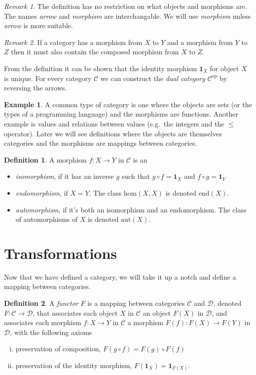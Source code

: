 \documentclass[11pt,a4paper]{scrartcl}
\newcommand{\idm}[1]{\mathbf{1}_{#1}}
\newcommand{\cdef}[1]{\emph{#1}}
\theoremstyle{plain}
\theoremstyle{definition}
\newtheorem{defn}{Definition}
\newtheorem{exmp}{Example}
\theoremstyle{remark}
\newtheorem*{remark}{Remark}
\begin{document}
\begin{remark}
	The definition has no restriction on what objects and morphisms are. The names \emph{arrow} and \emph{morphism} are interchangable. We will use \emph{morphism} unless \emph{arrow} is more suitable.
\end{remark}
\begin{remark}
	If a category has a morphism from $X$ to $Y$ and a morphism from $Y$ to $Z$ then it must also contain the composed morphism from $X$ to $Z$.
\end{remark}

From the definition it can be shown that the identity morphism $\idm{X}$ for object $X$ is unique. For every category $\mathcal C$ we can construct the \cdef{dual category} $\mathcal{C}^\text{op}$ by reversing the arrows.

\begin{exmp}
	A common type of category is one where the objects are sets (or the types of a programming language) and the morphisms are functions. Another example is values and relations between values (e.g.\ the integers and the $\leq$ operator). Later we will see definitions where the objects are themselves categories and the morphisms are mappings between categories.
\end{exmp}

\begin{defn}
A morphism $f\colon X \to Y$ in $\mathcal C$ is an
\begin{itemize}
	\item \cdef{isomorphism}, if it has an inverse $g$ such that $g\circ f = \idm{X}$ and $f\circ g = \idm{Y}$
	\item \cdef{endomorphism}, if $X = Y$. The class $\text{hom}(X, X)$ is denoted $\text{end}(X)$.
	\item \cdef{automorphism}, if it's both an isomorphism and an endomorphism. The class of automorphisms of $X$ is denoted $\text{aut}(X)$.
\end{itemize}
\end{defn}

\section{Transformations}

Now that we have defined a category, we will take it up a notch and define a mapping between categories.

\begin{defn}
A \cdef{functor} $F$ is a mapping between categories $\mathcal{C}$ and $\mathcal{D}$, denoted $F\colon \mathcal{C} \to \mathcal{D}$, that associates each object $X$ in $\mathcal{C}$ an object $F(X)$ in $\mathcal{D}$, and associates each morphism $f\colon X \to Y$ in $\mathcal{C}$ a morphism $F(f)\colon F(X) \to F(Y)$ in $\mathcal{D}$,
with the following axioms
\begin{enumerate}[(i)]
	\item preservation of composition, $F(g \circ f) = F(g) \circ F(f)$
	\item preservation of the identity morphism, $F(\idm{X}) = \idm{F(X)}$.
\end{enumerate}
\end{defn}
\end{document}
